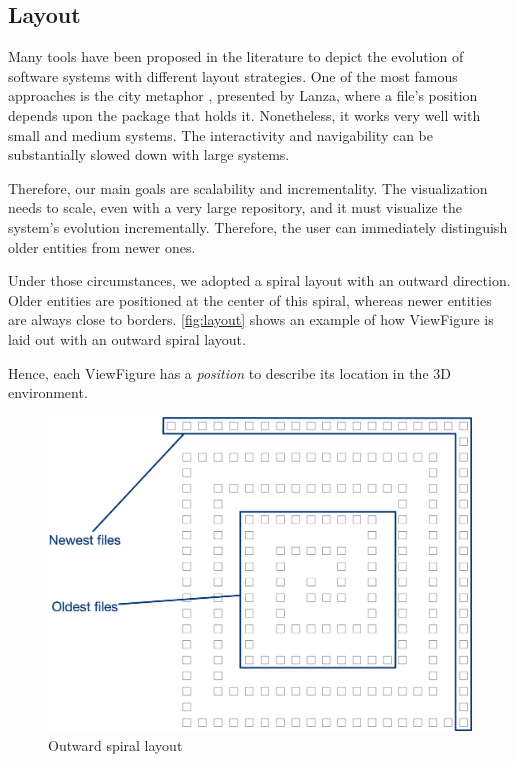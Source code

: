 \subsection*{Layout}
Many tools have been proposed in the literature to depict the evolution of software systems with different layout strategies. 
One of the most famous approaches is the city metaphor \cite{Wettel2007}, presented by Lanza, where a file's position depends upon the package that holds it. 
Nonetheless, it works very well with small and medium systems. The interactivity and navigability can be substantially slowed down with large systems.

Therefore, our main goals are scalability and incrementality. The visualization needs to scale, even with a very large repository, and it must visualize the system's evolution incrementally. Therefore, the user can immediately distinguish older entities from newer ones.

Under those circumstances, we adopted a spiral layout with an outward direction. Older entities are positioned at the center of this spiral, whereas newer entities are always close to borders. 
\autoref{fig:layout} shows an example of how ViewFigure is laid out with an outward spiral layout.

Hence, each ViewFigure has a \textit{position} to describe its location in the 3D environment. 

\begin{figure}
    \center
    \includegraphics[width=\textwidth]{SpiralLayout.jpg}
    \caption{Outward spiral layout}
    \label{fig:layout}
\end{figure}

